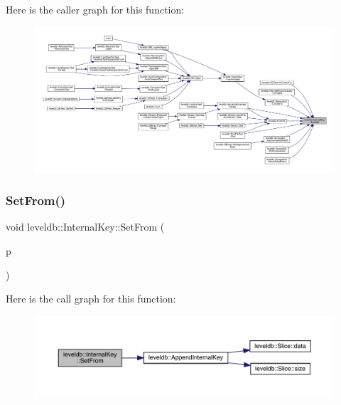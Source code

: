 Here is the caller graph for this function\+:
\nopagebreak
\begin{figure}[H]
\begin{center}
\leavevmode
\includegraphics[width=350pt]{classleveldb_1_1_internal_key_a0cb2fdabc879bdbe7afc3ba12152384c_icgraph}
\end{center}
\end{figure}
\mbox{\label{classleveldb_1_1_internal_key_ada9566cd92b6b9784ab7f2f6f71d0a4e}} 
\subsubsection{\texorpdfstring{SetFrom()}{SetFrom()}}
{\footnotesize\ttfamily void leveldb\+::\+Internal\+Key\+::\+Set\+From (\begin{DoxyParamCaption}\item[{const \mbox{\hyperlink{structleveldb_1_1_parsed_internal_key}{Parsed\+Internal\+Key}} \&}]{p }\end{DoxyParamCaption})\hspace{0.3cm}{\ttfamily [inline]}}

Here is the call graph for this function\+:
\nopagebreak
\begin{figure}[H]
\begin{center}
\leavevmode
\includegraphics[width=350pt]{classleveldb_1_1_internal_key_ada9566cd92b6b9784ab7f2f6f71d0a4e_cgraph}
\end{center}
\end{figure}
\mbox{\label{classleveldb_1_1_internal_key_a9673dbb181eaa977e6f09c45b02938bc}} 
